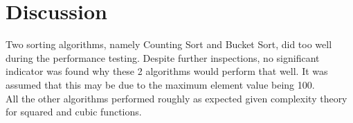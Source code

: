 \chapter{Discussion}

Two sorting algorithms, namely Counting Sort and Bucket Sort, did too well during the performance testing.
Despite further inspections, no significant indicator was found why these 2 algorithms would perform that well. 
It was assumed that this may be due to the maximum element value being 100.\\
All the other algorithms performed roughly as expected given complexity theory for squared and cubic functions.
